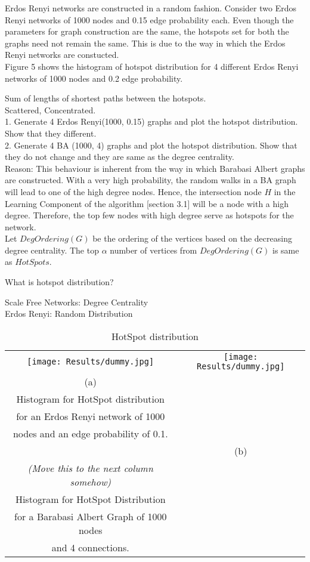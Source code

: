 \documentclass{article}
\begin{document}
Erdos Renyi networks are constructed in a random fashion. Consider two Erdos Renyi networks of 1000 nodes and 0.15 edge probability each. Even though the parameters for graph construction are the same, the hotspots set for both the graphs need not remain the same. This is due to the way in which the Erdos Renyi networks are constucted.\\
Figure 5 shows the histogram of hotspot distribution for 4 different Erdos Renyi networks of 1000 nodes and 0.2 edge probability.

Sum of lengths of shortest paths between the hotspots.\\
Scattered, Concentrated.\\


1. Generate 4 Erdos Renyi(1000, 0.15) graphs and plot the hotspot distribution. Show that they different.\\
2. Generate 4 BA (1000, 4) graphs and plot the hotspot distribution. Show that they do not change and they are same as the degree centrality.\\
Reason: This behaviour is inherent from the way in which Barabasi Albert graphs are constructed. With a very high probability, the random walks in a BA graph will lead to one of the high degree nodes. Hence, the intersection node $H$ in the Learning Component of the algorithm [section 3.1] will be a node with a high degree. Therefore, the top few nodes with high degree serve as hotspots for the network. \\
Let $DegOrdering(G)$ be the ordering of the vertices based on the decreasing degree centrality. The top $\alpha$ number of vertices from $DegOrdering(G)$ is same as $HotSpots$. 

What is hotspot distribution?


Scale Free Networks: Degree Centrality\\
Erdos Renyi: Random Distribution\\

\begin{table}[ht]
\centering
\caption{HotSpot distribution}

\begin{tabular}{cc}
\texttt{[image: Results/dummy.jpg]}
&
\texttt{[image: Results/dummy.jpg]}\\

(a)\\
Histogram for HotSpot distribution\\
for an Erdos Renyi network of 1000 \\
nodes and an edge probability of 0.1.\\
&
(b)\\
\textit{(Move this to the next column somehow)}\\
Histogram for HotSpot Distribution\\
for a Barabasi Albert Graph of 1000 nodes\\
and 4 connections.
\end{tabular}
\label{tab:gt}
\end{table}
\end{document}
